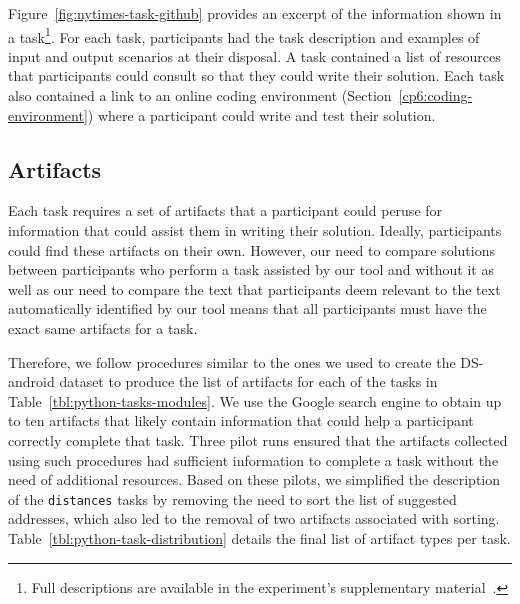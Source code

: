Figure~\ref{fig:nytimes-task-github} provides an excerpt of the information shown in a task\footnote{Full descriptions are available in the experiment's supplementary material~\cite{dspython}.}.
For each task, participants had the task description and examples of input and output scenarios at their disposal. A task contained a list of resources that participants could consult 
so that they could write their solution.
Each task also contained a link to an online coding environment (Section~\ref{cp6:coding-environment})
where a participant could write and test their solution. 










\subsection{Artifacts}
\label{cp6:experiment-artifacts}




Each task requires a set of artifacts that a participant could peruse for information that could assist them in writing their solution.
Ideally, participants could find these artifacts on their own. However, our need to compare solutions between participants who perform a task 
assisted by our tool and without it as well as our need to compare the text that participants deem relevant to the text
automatically identified by our tool means that all participants must have the exact same artifacts for a task.


Therefore,
we follow procedures similar to the ones we used to create the \acs{DS-android} dataset to produce the list of artifacts for each of the tasks in Table~\ref{tbl:python-tasks-modules}. 
We use the Google search engine to obtain up to ten artifacts that likely contain 
information that could help a participant correctly complete that task. 
Three pilot runs ensured that the artifacts collected using such procedures had sufficient information to complete a task without 
the need of additional resources. Based on these pilots, we simplified the description of the \texttt{distances} tasks by removing the need to sort the list of suggested addresses, which also led to the removal of two artifacts associated with sorting. Table~\ref{tbl:python-task-distribution} details the final list 
of artifact types per task.





